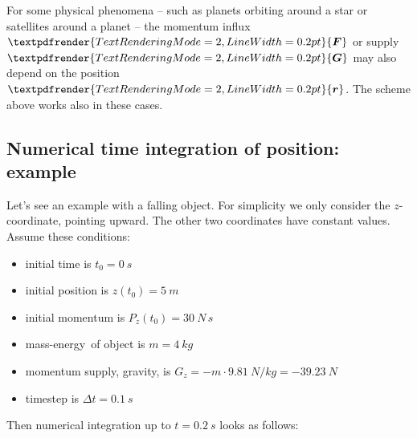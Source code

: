 \documentclass[a4paper,12pt,%
onecolumn,oneside,%
british%
]{memoir}
\renewcommand*{\bm}[1]{\textpdfrender{TextRenderingMode=2,LineWidth=0.2pt}{\boldsymbol{#1}}}
\newcommand*{\incr}{\Delta}%
\renewcommand*{\|}[1][]{\nonscript\:#1\vert\nonscript\:\mathopen{}}
\newcommand*{\masse}{mass-energy}
\newcommand*{\yr}{\bm{r}}
\newcommand*{\yti}{t_{0}}
\newcommand*{\Dt}{\incr t}
\newcommand*{\yM}{m}%
\newcommand*{\yF}{\bm{F}}
\newcommand*{\yG}{\bm{G}}
\begin{document}
For some physical phenomena -- such as planets orbiting around a star or satellites around a planet -- the momentum influx $\yF$ or supply $\yG$ may also depend on the position $\yr$. The scheme above works also in these cases.

\subsection{Numerical time integration of position: example}
\label{sec:example_falling_object_timestep}

Let's see an example with a falling object. For simplicity we only consider the $z$-coordinate, pointing upward. The other two coordinates have constant values. Assume these conditions:
\begin{itemize}[nosep]
\item initial time is $\yti=\qty{0}{s}$
\item initial position is $z(\yti)=\qty{5}{m}$
\item initial momentum is $P_{z}(\yti)=\qty{30}{N\,s}$
\item \masse\ of object is $\yM=\qty{4}{kg}$
\item momentum supply, gravity, is $G_{z}=-\yM\cdot\qty{9.81}{N/kg} = \qty{-39.23}{N}$
\item timestep is $\Dt = \qty{0.1}{s}$
\end{itemize}
Then numerical integration up to $t=\qty{0.2}{s}$ looks as follows:\noprelistbreak
\end{document}
